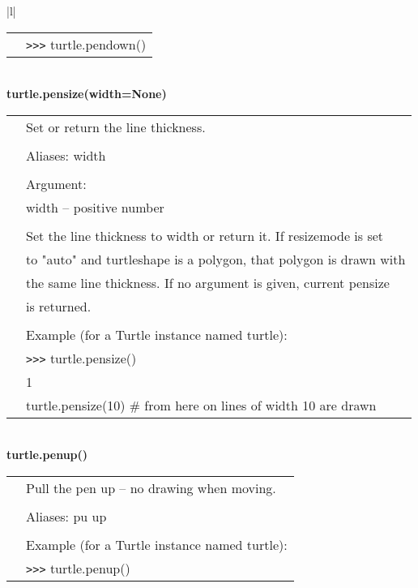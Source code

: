 \begin{center}
{\begin{tabular}{|l|}
\begin{tabular}{p{0.25in}p{4in}}
&        \verb+>+\verb+>+\verb+>+ turtle.pendown() \\
\end{tabular} \\ \hline
{\bf    turtle.pensize(width=None)} \\
   \begin{tabular}{p{0.25in}p{4in}}
&        Set or return the line thickness. \\
&  \\
&        Aliases:   width \\
&  \\
&        Argument: \\
&        width -- positive number \\
&  \\
&        Set the line thickness to width or return it. If resizemode is set \\
&        to "auto" and turtleshape is a polygon, that polygon is drawn with \\
&        the same line thickness. If no argument is given, current pensize \\
&        is returned. \\
&  \\
&        Example (for a Turtle instance named turtle): \\
&        \verb+>+\verb+>+\verb+>+ turtle.pensize() \\
&        1 \\
&        turtle.pensize(10)   \# from here on lines of width 10 are drawn \\
\end{tabular} \\ \hline
{\bf    turtle.penup()} \\
   \begin{tabular}{p{0.25in}p{4in}}
&        Pull the pen up -- no drawing when moving. \\
&  \\
&        Aliases:  pu  up \\
&  \\

&        Example (for a Turtle instance named turtle): \\
&        \verb+>+\verb+>+\verb+>+ turtle.penup() \\
\end{tabular} \\ \hline

\end{tabular}}
\end{center}
